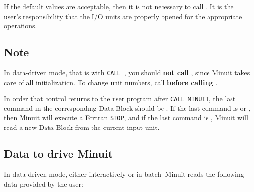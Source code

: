 
If the default values are acceptable, then it is not necessary to
call .
It is the user's responsibility that the I/O units are properly
opened for the appropriate operations.
 
\subsection*{Note}
 
In data-driven mode, that is with \texttt{CALL}~, you should
{\bf not call }, since Minuit takes care of all
initialization. 
To change unit numbers, call  
{\bf before calling }.
 
In order that control returns to the user program after
\texttt{CALL MINUIT}, the last command in the corresponding Data Block
should be .  
If the last command is  or ,
then Minuit will execute a Fortran \texttt{STOP}, and if the last
command is , Minuit will read a new Data Block from the current
input unit.
 
\subsection{Data to drive Minuit}
 
In data-driven mode, either interactively or in batch,
Minuit reads the following data provided by the user:

